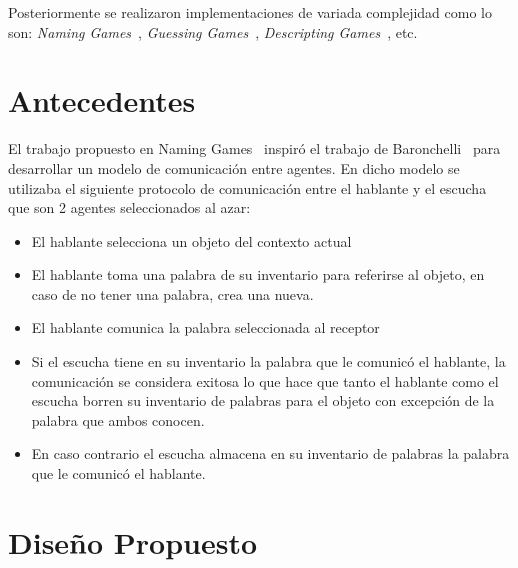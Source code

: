 \documentclass[runningheads]{llncs}
\begin{document}
Posteriormente se realizaron implementaciones de variada complejidad como lo son: \textit{Naming Games}~\cite{RePEc:wsi:acsxxx:v:01:y:1999:i:04:n:s021952599800020x}, \textit{Guessing Games}~\cite{Baronchelli_2006}, \textit{Descripting Games}~\cite{Baronchelli_2006}, etc.
\section{Antecedentes}
El trabajo propuesto en Naming Games~\cite{Baronchelli_2006} inspiró el trabajo de Baronchelli~\cite{Baronchelli_2006} para desarrollar un modelo de comunicación entre agentes. En dicho modelo se utilizaba el siguiente protocolo de comunicación entre el hablante y el escucha que son 2 agentes seleccionados al azar:
\begin{itemize}
	\item El hablante selecciona un objeto del contexto actual
	\item El hablante toma una palabra de su inventario para referirse al objeto, en caso de no tener una palabra, crea una nueva.
	\item El hablante comunica la palabra seleccionada al receptor
	\item Si el escucha tiene en su inventario la palabra que le comunicó el hablante, la comunicación se considera exitosa lo que hace que tanto el hablante como el escucha borren su inventario de palabras para el objeto con excepción de la palabra que ambos conocen.
	\item En caso contrario el escucha almacena en su inventario de palabras la palabra que le comunicó el hablante.
\end{itemize}

\section{Diseño Propuesto}
\end{document}
